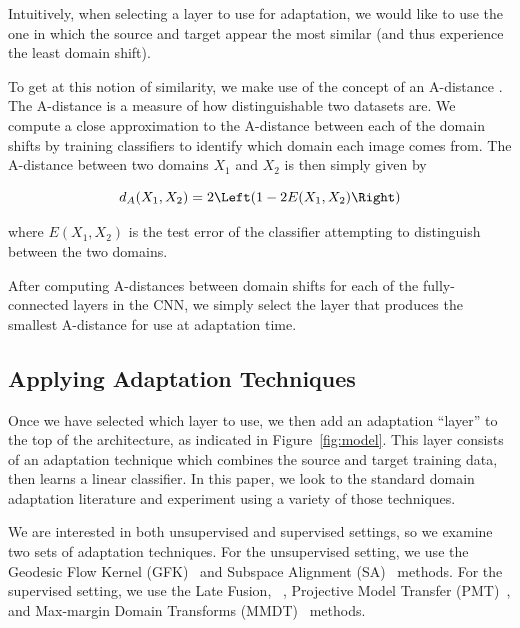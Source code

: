 Intuitively, when selecting a layer to use for adaptation, we would like to use
the one in which the source and target appear the most similar (and thus
experience the least domain shift).

To get at this notion of similarity, we make use of the concept of an A-distance
. The A-distance is a measure of how distinguishable
two datasets are. We compute a close approximation to the A-distance between
each of the domain shifts by training classifiers to identify which domain each
image comes from. The A-distance between two domains $X_1$ and $X_2$ is then
simply given by

\begin{equation}
  d_A(X_1, X_2) = 2 \Left( 1 - 2E(X_1, X_2) \Right)
\end{equation}

where $E(X_1, X_2)$ is the test error of the classifier attempting to
distinguish between the two domains.

After computing A-distances between domain shifts for each of the
fully-connected layers in the CNN, we simply select the layer that produces the
smallest A-distance for use at adaptation time.

\subsection{Applying Adaptation Techniques}

Once we have selected which layer to use, we then add an adaptation ``layer'' to
the top of the architecture, as indicated in Figure~\ref{fig:model}. This layer
consists of an adaptation technique which combines the source and target
training data, then learns a linear classifier. In this paper, we look to the
standard domain adaptation literature and experiment using a variety of those
techniques.

We are interested in both unsupervised and supervised settings, so we examine
two sets of adaptation techniques. For the unsupervised setting, we use the
Geodesic Flow Kernel (GFK)~\cite{gong-cvpr12} and Subspace Alignment
(SA)~\cite{sa} methods. For the supervised setting, we use the Late Fusion,
\daume~\cite{daume}, Projective Model Transfer (PMT)~\cite{aytar-iccv11}, and
Max-margin Domain Transforms (MMDT)~\cite{hoffman-iclr13} methods.
